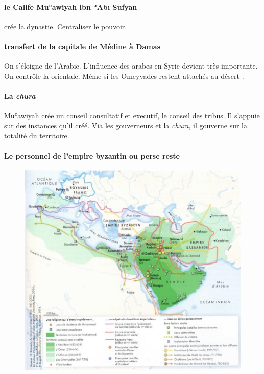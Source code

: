 \paragraph{le Calife  Muʿāwiyah ibn ʾAbī Sufyān} crée la dynastie. Centraliser le pouvoir. 

\paragraph{transfert de la capitale de Médine à Damas} On s'éloigne de l'Arabie. L'influence des arabes en Syrie devient très importante. On contrôle la \Med orientale. Même si les Omeyyades restent attachés au désert .

\paragraph{La \textit{chura}} Muʿāwiyah crée un conseil consultatif et executif, le conseil des tribus. Il s'appuie sur des instances qu'il créé. Via les gouverneurs et la \textit{chura}, il gouverne sur la totalité du territoire.

\paragraph{Le personnel de l'empire byzantin ou perse reste} 



\begin{figure}[h!]
    \centering
   \includegraphics[width=\textwidth]{HistoireIslamMediterranee/Images/ExpansionMusulmane.png}
  
    \label{fig:my_label}
\end{figure}
